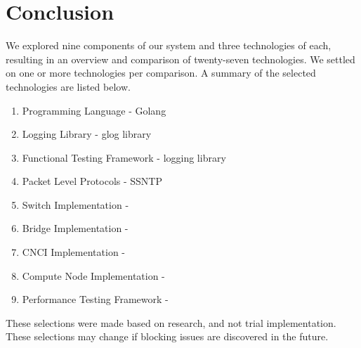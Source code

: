 \documentclass[10pt,letterpaper,onecolumn,draftclsnofoot]{IEEEtran}
\begin{document}
\section{Conclusion}

We explored nine components of our system and three technologies of each,
resulting in an overview and comparison of twenty-seven technologies. We settled
on one or more technologies per comparison. A summary of the selected
technologies are listed below.

\begin{enumerate}
	\item Programming Language - Golang
	\item Logging Library - glog library
	\item Functional Testing Framework - logging library
	\item Packet Level Protocols - SSNTP
	\item Switch Implementation -
	\item Bridge Implementation -
	\item CNCI Implementation -
	\item Compute Node Implementation -
	\item Performance Testing Framework -
\end{enumerate}

These selections were made based on research, and not trial implementation.
These selections may change if blocking issues are discovered in the future.



\end{document}
